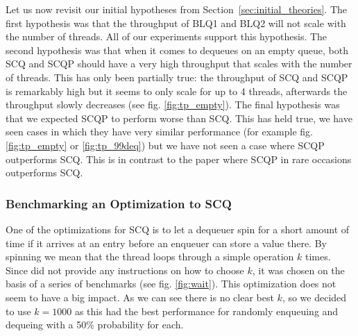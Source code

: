 \documentclass{article}      %
\begin{document}
Let us now revisit our initial hypotheses from Section~\ref{sec:initial_theories}. The first hypothesis was that the throughput of BLQ1 and BLQ2 will not scale with the number of threads. All of our experiments support this hypothesis. The second hypothesis was that when it comes to dequeues on an empty queue, both SCQ and SCQP should have a very high throughput that scales with the number of threads. This has only been partially true: the throughput of SCQ and SCQP is remarkably high but it seems to only scale for up to 4 threads, afterwards the throughput slowly decreases (see fig. \ref{fig:tp_empty}). The final hypothesis was that we expected SCQP to perform worse than SCQ. This has held true, we have seen cases in which they have very similar performance (for example fig. \ref{fig:tp_empty} or \ref{fig:tp_99deq}) but we have not seen a case where SCQP outperforms SCQ. This is in contrast to the paper where SCQP in rare occasions outperforms SCQ.


\subsubsection{Benchmarking an Optimization to SCQ}
\label{sec:bench_opt}

One of the optimizations for SCQ is to let a dequeuer spin for a short amount of time if it arrives at an entry before an enqueuer can store a value there. By spinning we mean that the thread loops through a simple operation $k$ times. Since \cite{nikolaev2019scalable} did not provide any instructions on how to choose $k$, it was chosen on the basis of a series of benchmarks (see fig. \ref{fig:wait}). This optimization does not seem to have a big impact. As we can see there is no clear best $k$, so we decided to use $k=1000$ as this had the best performance for randomly enqueuing and dequeing with a 50\% probability for each.
\end{document}
